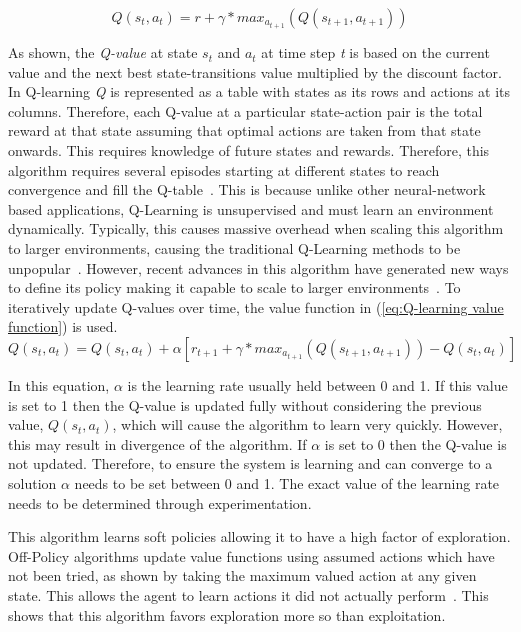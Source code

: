 \documentclass[12pt,american]{report}
\begin{document}
        \begin{equation}
            \label{eq:bellman}
            Q(s_{t},a_{t}) = r + \gamma*max_{a_{t+1} }(Q(s_{t+1},a_{t+1}))
        \end{equation}

        As shown, the \textit{Q-value} at state \textit{$s_t$} and \textit{$a_t$} at time step \textit{t} is based on the current value and the next best state-transitions value multiplied by the discount factor. In Q-learning \textit{Q} is represented as a table with states as its rows and actions at its columns.  Therefore, each Q-value at a particular state-action pair is the total reward at that state assuming that optimal actions are taken from that state onwards.  This requires knowledge of future states and rewards.  Therefore, this algorithm requires several episodes starting at different states to reach convergence and fill the Q-table~\cite{Watkins:1992}. This is because unlike other neural-network based applications, Q-Learning is unsupervised and must learn an environment dynamically. Typically, this causes massive overhead when scaling this algorithm to larger environments, causing the traditional Q-Learning methods to be unpopular~\cite{peng2015mobile}.  However, recent advances in this algorithm have generated new ways to define its policy making it capable to scale to larger environments~\cite{Greedy}. To iteratively update Q-values over time, the value function in (\ref{eq:Q-learning value function}) is used. 
        \begin{equation}
            \label{eq:Q-learning value function}
            Q(s_{t},a_{t}) = Q(s_{t},a_{t}) + \alpha[r_{t+1} + \gamma*max_{a_{t+1} }(Q(s_{t+1},a_{t+1}))-Q(s_{t},a_{t})]
        \end{equation}

        In this equation, \textit{$\alpha$} is the learning rate usually held between 0 and 1.  If this value is set to 1 then the Q-value is updated fully without considering the previous value, \textit{$Q(s_t,a_t)$}, which will cause the algorithm to learn very quickly. However, this may result in divergence of the algorithm.  If \textit{$\alpha$} is set to 0 then the Q-value is not updated.  Therefore, to ensure the system is learning and can converge to a solution \textit{$\alpha$} needs to be set between 0 and 1. The exact value of the learning rate needs to be determined through experimentation.

        This algorithm learns soft policies allowing it to have a high factor of exploration. Off-Policy algorithms update value functions using assumed actions which have not been tried, as shown by taking the maximum valued action at any given state.  This allows the agent to learn actions it did not actually perform~\cite{Eden}. This shows that this algorithm favors exploration more so than exploitation.  
\end{document}
